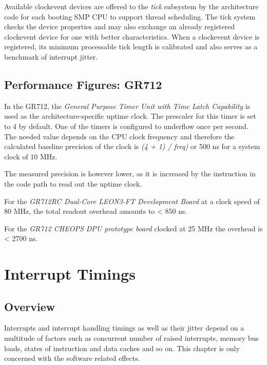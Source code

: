 Available clockevent devices are offered to the \emph{tick} subsystem by the 
architecture code for each booting SMP CPU to support thread scheduling. The
tick system checks the device properties and may also exchange an already
registered clockevent device for one with better characteristics. When a
clockevent device is registered, its minimum processable tick length
is calibrated and also serves as a benchmark of interrupt jitter.



\section{Performance Figures: GR712}

In the GR712, the \emph{General Purpose Timer Unit with Time Latch Capability}\cite{GR712UM}
is used as the architecture-specific uptime clock. The prescaler for this timer
is set to 4 by default. One of the timers is configured to underflow once
per second. The needed value depends on the CPU clock frequency and therefore
the calculated baseline precision of the clock is \emph{ (4 + 1) / freq)} or 500 ns 
for a system clock of 10 MHz.


The measured precision is however lower, as it is increased by the
instruction in the code path to read out the uptime clock.

For the \emph{GR712RC Dual-Core LEON3-FT Development Board} at a clock speed of
80 MHz, the total readout overhead amounts to < 850 ns.

For the \emph{GR712 CHEOPS DPU prototype board} clocked at 25 MHz
the overhead is < 2700 ns.



\chapter{Interrupt Timings}

\section{Overview}

Interrupts and interrupt handling timings as well as their jitter depend on a
multitude of factors such as concurrent number of raised interrupts, memory bus
loads, states of instruction and data caches and so on. This chapter is only
concerned with the software related effects.

